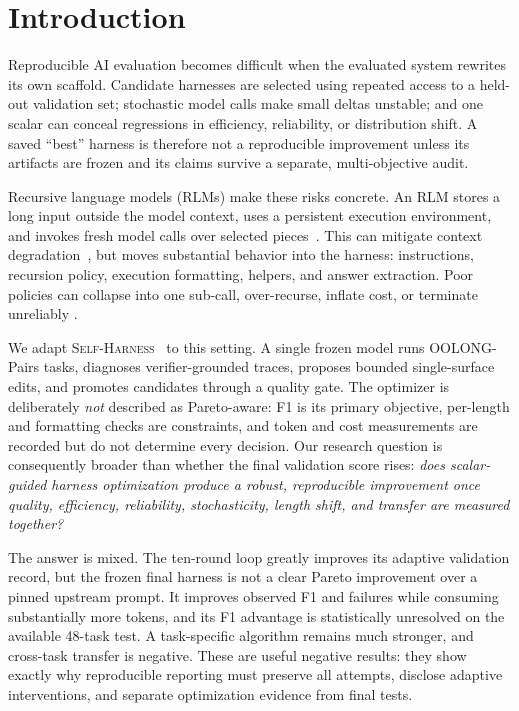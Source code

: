 \documentclass[letterpaper]{article} %
\newcommand{\rlm}{\textsc{RLM}\xspace}
\newcommand{\rlms}{\textsc{RLM}s\xspace}
\newcommand{\sh}{\textsc{Self-Harness}\xspace}
\begin{document}
\section{Introduction}
Reproducible AI evaluation becomes difficult when the evaluated system rewrites
its own scaffold. Candidate harnesses are selected using repeated access to a
held-out validation set; stochastic model calls make small deltas unstable; and
one scalar can conceal regressions in efficiency, reliability, or distribution
shift. A saved ``best'' harness is therefore not a reproducible improvement
unless its artifacts are frozen and its claims survive a separate,
multi-objective audit.

Recursive language models (\rlms) make these risks concrete. An \rlm{} stores a
long input outside the model context, uses a persistent execution environment,
and invokes fresh model calls over selected pieces~\citep{zhang2025rlm}. This can
mitigate context degradation~\citep{hong2025contextrot}, but moves substantial
behavior into the harness: instructions, recursion policy, execution formatting,
helpers, and answer extraction. Poor policies can collapse into one sub-call,
over-recurse, inflate cost, or terminate unreliably
\citep{zhang2026harness,wang2026overthink,guha2026termination}.

We adapt \sh{}~\citep{zhang2026selfharness} to this setting. A single frozen model
runs OOLONG-Pairs tasks, diagnoses verifier-grounded traces, proposes bounded
single-surface edits, and promotes candidates through a quality gate. The
optimizer is deliberately \emph{not} described as Pareto-aware: F1 is its primary
objective, per-length and formatting checks are constraints, and token and cost
measurements are recorded but do not determine every decision. Our research
question is consequently broader than whether the final validation score rises:
\emph{does scalar-guided harness optimization produce a robust, reproducible
improvement once quality, efficiency, reliability, stochasticity, length shift,
and transfer are measured together?}

The answer is mixed. The ten-round loop greatly improves its adaptive validation
record, but the frozen final harness is not a clear Pareto improvement over a
pinned upstream prompt. It improves observed F1 and failures while consuming
substantially more tokens, and its F1 advantage is statistically unresolved on
the available 48-task test. A task-specific algorithm remains much stronger,
and cross-task transfer is negative. These are useful negative results: they
show exactly why reproducible reporting must preserve all attempts, disclose
adaptive interventions, and separate optimization evidence from final tests.
\end{document}
